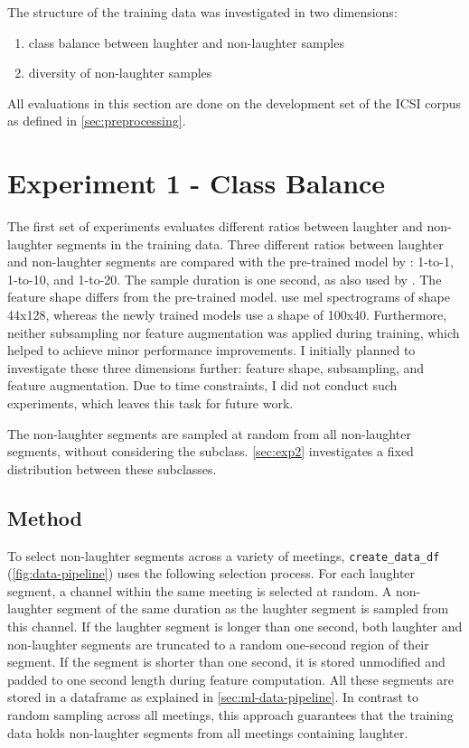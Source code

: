 \documentclass[bsc,frontabs,parskip,deptreport]{infthesis}
\begin{document}
The structure of the training data was investigated in two dimensions: 
\begin{enumerate}
    \item class balance between laughter and non-laughter samples
    \item diversity of non-laughter samples 
\end{enumerate}

All evaluations in this section are done on the development set of the ICSI corpus as defined in \autoref{sec:preprocessing}.

\section{Experiment 1 - Class Balance} \label{sec:exp-1}
The first set of experiments evaluates different ratios between laughter and non-laughter segments in the training data.
Three different ratios between laughter and non-laughter segments are compared with the pre-trained model by \citet{gillick2021robust}: 1-to-1, 1-to-10, and 1-to-20.
The sample duration is one second, as also used by \citet{gillick2021robust}. The feature shape differs from the pre-trained model. \citet{gillick2021robust} use mel spectrograms of shape 44x128, whereas the newly trained models use a shape of 100x40.
Furthermore, neither subsampling nor feature augmentation was applied during training, which helped \citet{gillick2021robust} to achieve minor performance improvements.
I initially planned to investigate these three dimensions further: feature shape, subsampling, and feature augmentation. 
Due to time constraints, I did not conduct such experiments, which leaves this task for future work. 

The non-laughter segments are sampled at random from all non-laughter segments, without considering the subclass. 
\autoref{sec:exp2} investigates a fixed distribution between these subclasses. 


\subsection{Method}
To select non-laughter segments across a variety of meetings, \verb|create_data_df| (\autoref{fig:data-pipeline}) uses the following selection process.
For each laughter segment, a channel within the same meeting is selected at random.
A non-laughter segment of the same duration as the laughter segment is sampled from this channel.
If the laughter segment is longer than one second, both laughter and non-laughter segments are truncated to a random one-second region of their segment. 
If the segment is shorter than one second, it is stored unmodified and padded to one second length during feature computation.
All these segments are stored in a dataframe as explained in \autoref{sec:ml-data-pipeline}.
In contrast to random sampling across all meetings, this approach guarantees that the training data holds non-laughter segments from all meetings containing laughter. 
\end{document}
